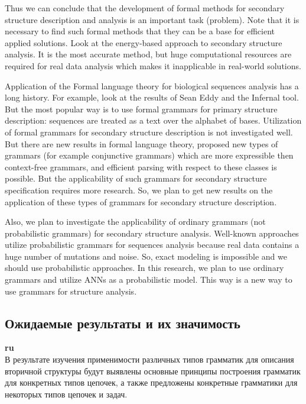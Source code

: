 \documentclass[12pt]{article}  %
\theoremstyle{remark}
\begin{document}
Thus we can conclude that the development of formal methods for secondary structure description and analysis is an important task (problem).
Note that it is necessary to find such formal methods that they can be a base for efficient applied solutions.
Look at the energy-based approach to secondary structure analysis. It is the most accurate method, but huge computational resources are required for real data analysis which makes it inapplicable in real-world solutions.

Application of the Formal language theory for biological sequences analysis has a long history. For example, look at the results of Sean Eddy and the Infernal tool. But the most popular way is to use formal grammars for primary structure description: sequences are treated as a text over the alphabet of bases. Utilization of formal grammars for secondary structure description is not investigated well.
But there are new results in formal language theory, proposed new types of grammars (for example conjunctive grammars) which are more expressible then context-free grammars, and efficient parsing with respect to these classes is possible.
But the applicability of such grammars for secondary structure specification requires more research.
So, we plan to get new results on the application of these types of grammars for secondary structure description.

Also, we plan to investigate the applicability of ordinary grammars (not probabilistic grammars) for secondary structure analysis.
Well-known approaches utilize probabilistic grammars for sequences analysis because real data contains a huge number of mutations and noise. So, exact modeling is impossible and we should use probabilistic approaches.
In this research, we plan to use ordinary grammars and utilize ANNs as a probabilistic model. This way is a new way to use grammars for structure analysis.

\subsection{Ожидаемые результаты и их значимость}

\textbf{ru}\\
В результате изучения применимости различных типов грамматик для описания вторичной структуры будут выявлены основные принципы построения грамматик для конкретных типов цепочек, а также предложены конкретные грамматики для некоторых типов цепочек и задач.
\end{document}
